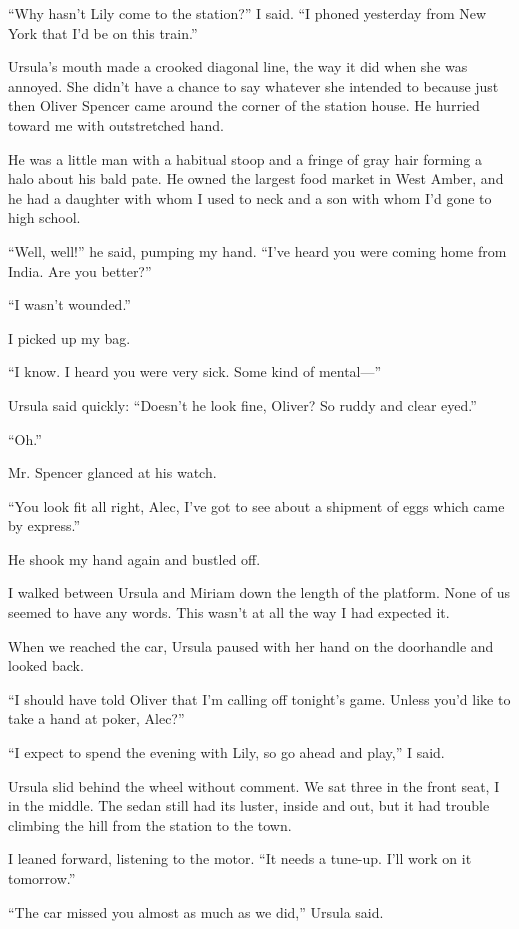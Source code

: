 \documentclass{novel}
\begin{document}
“Why hasn’t Lily come to the station?” I said. “I phoned yesterday from New York that I’d be on this train.”

Ursula’s mouth made a crooked diagonal line, the way it did when she was annoyed. She didn’t have a chance to say whatever she intended to because just then Oliver Spencer came around the corner of the station house. He hurried toward me with outstretched hand.

He was a little man with a habitual stoop and a fringe of gray hair forming a halo about his bald pate. He owned the largest food market in West Amber, and he had a daughter with whom I used to neck and a son with whom I’d gone to high school.

“Well, well!” he said, pumping my hand. “I’ve heard you were coming home from India. Are you better?”

“I wasn’t wounded.”

I picked up my bag.

“I know. I heard you were very sick. Some kind of mental—”

Ursula said quickly: “Doesn’t he look fine, Oliver? So ruddy and clear eyed.”

“Oh.”

Mr. Spencer glanced at his watch.

“You look fit all right, Alec, I’ve got to see about a shipment of eggs which came by express.”

He shook my hand again and bustled off.

\scenestars

I walked between Ursula and Miriam down the length of the platform. None of us seemed to have any words. This wasn’t at all the way I had expected it.

When we reached the car, Ursula paused with her hand on the doorhandle and looked back.

“I should have told Oliver that I’m calling off tonight’s game. Unless you’d like to take a hand at poker, Alec?”

“I expect to spend the evening with Lily, so go ahead and play,” I said.

Ursula slid behind the wheel without comment. We sat three in the front seat, I in the middle. The sedan still had its luster, inside and out, but it had trouble climbing the hill from the station to the town.

I leaned forward, listening to the motor. “It needs a tune-up. I’ll work on it tomorrow.”

“The car missed you almost as much as we did,” Ursula said.
\end{document}
